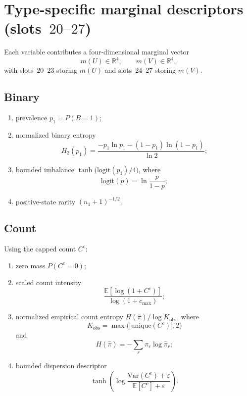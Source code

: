 \section{Type-specific marginal descriptors (slots~$20$--$27$)}
\label{app:hcr-marginals}

Each variable contributes a four-dimensional marginal vector
\begin{equation}
m(U)\in\mathbb{R}^{4},\qquad m(V)\in\mathbb{R}^{4},
\end{equation}
with slots~$20$--$23$ storing $m(U)$ and slots~$24$--$27$ storing $m(V)$.

\subsection*{Binary}
\begin{enumerate}[label=\arabic*.]
\item prevalence $p_{1}=P(B=1)$;
\item normalized binary entropy
\begin{equation}
H_{2}(p_{1})
=
\frac{-p_{1}\ln p_{1}-(1-p_{1})\ln(1-p_{1})}{\ln 2};
\end{equation}
\item bounded imbalance $\tanh\bigl(\mathrm{logit}(p_{1})/4\bigr)$, where
\begin{equation}
\mathrm{logit}(p)=\ln\frac{p}{1-p};
\end{equation}
\item positive-state rarity $(n_{1}+1)^{-1/2}$.
\end{enumerate}

\subsection*{Count}
Using the capped count $C^{c}$:
\begin{enumerate}[label=\arabic*.]
\item zero mass $P(C^{c}=0)$;
\item scaled count intensity
\begin{equation}
\frac{\mathbb{E}[\log(1+C^{c})]}{\log(1+c_{\max})};
\end{equation}
\item normalized empirical count entropy $H(\hat{\pi})/\log K_{\mathrm{obs}}$, where
\begin{equation}
K_{\mathrm{obs}}=\max\bigl(|\mathrm{unique}(C^{c})|,2\bigr)
\end{equation}
and
\begin{equation}
H(\hat{\pi})=-\sum_{r}\hat{\pi}_{r}\log\hat{\pi}_{r};
\end{equation}
\item bounded dispersion descriptor
\begin{equation}
\tanh\!\left(
\log\frac{\mathrm{Var}(C^{c})+\varepsilon}{\mathbb{E}[C^{c}]+\varepsilon}
\right).
\end{equation}
\end{enumerate}

